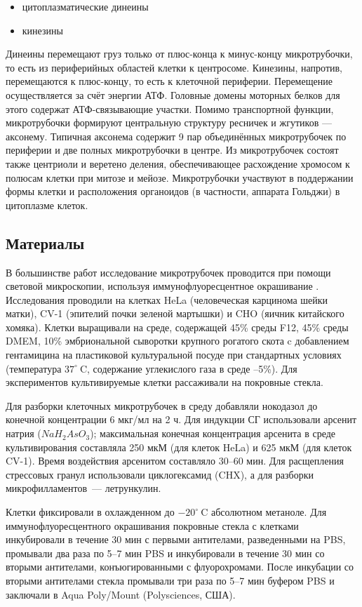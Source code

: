 \documentclass[14pt,a4paper]{extarticle}
\begin{document}
\begin{itemize}
\item цитоплазматические динеины
\item кинезины
\end{itemize}

	Динеины перемещают груз только от плюс-конца к минус-концу микротрубочки, то есть из периферийных областей клетки к центросоме. Кинезины, напротив, перемещаются к плюс-концу, то есть к клеточной периферии.
Перемещение осуществляется за счёт энергии АТФ. Головные домены моторных белков для этого содержат АТФ-связывающие участки.
Помимо транспортной функции, микротрубочки формируют центральную структуру ресничек и жгутиков — аксонему. Типичная аксонема содержит 9 пар объединённых микротрубочек по периферии и две полных микротрубочки в центре. Из микротрубочек состоят также центриоли и веретено деления, обеспечивающее расхождение хромосом к полюсам клетки при митозе и мейозе. Микротрубочки участвуют в поддержании формы клетки и расположения органоидов (в частности, аппарата Гольджи) в цитоплазме клеток.

 
\subsection{Материалы}
	В большинстве работ исследование микротрубочек проводится при помощи световой микроскопии, используя иммунофлуоресцентное окрашивание \cite{Nadezhdina:2010uq}.
Исследования проводили на клетках HeLa (человеческая карцинома шейки матки), CV-1 (эпителий почки зеленой мартышки) и CHO (яичник китайского хомяка). Клетки выращивали на среде, содержащей 45\% среды F12, 45\% среды DMEM, 10\% эмбриональной сыворотки крупного рогатого скота  c добавлением гентамицина на пластиковой культуральной посуде при стандартных условиях (температура $37^{\circ}~\mathrm{C}$, содержание углекислого газа в среде –5\%). Для экспериментов культивируемые клетки рассаживали на покровные стекла.

	Для разборки клеточных микротрубочек в среду добавляли нокодазол до конечной концентрации 6 мкг/мл на 2 ч. Для индукции СГ использовали арсенит натрия ($NaH_2AsO_3$); максимальная конечная концентрация арсенита в среде культивирования составляла 250 мкМ (для клеток HeLa) и 625 мкМ (для клеток CV-1). Время воздействия арсенитом составляло 30--60 мин. Для расщепления стрессовых гранул использовали циклогексамид (CHX), а для разборки микрофилламентов~--- летрункулин.

	Клетки фиксировали в охлажденном до $-20^{\circ}~\mathrm{C}$ абсолютном метаноле. Для иммунофлуоресцентного окрашивания покровные стекла с клетками инкубировали в течение 30 мин с первыми антителами, разведенными на PBS, промывали два раза по 5--7 мин PBS и инкубировали в течение 30 мин со вторыми антителами, конъюгированными с флуорохромами. После инкубации со вторыми антителами стекла промывали три раза по 5--7 мин буфером PBS и заключали в Aqua Poly/Mount (Polysciences, США).
\end{document}
